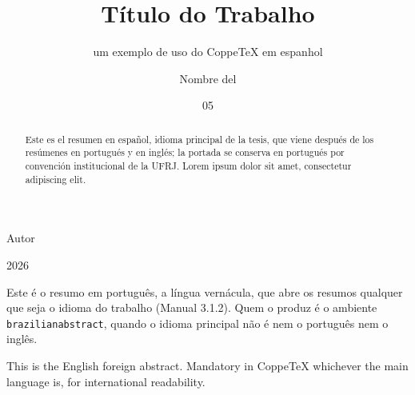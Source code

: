 \documentclass[spanish,dsc]{ufrj}
\begin{document}
  \title{Título do Trabalho}
  \subtitle{um exemplo de uso do CoppeTeX em espanhol}
  \author{Nombre del}{Autor}
  \date{05}{2026}
  \maketitle
  \frontmatter
  \begin{brazilianabstract}
    Este é o resumo em português, a língua vernácula, que abre os resumos
    qualquer que seja o idioma do trabalho (Manual 3.1.2). Quem o produz é o
    ambiente \texttt{brazilianabstract}, quando o idioma principal não é nem
    o português nem o inglês.
  \end{brazilianabstract}
  \begin{foreignabstract}
    This is the English foreign abstract. Mandatory in CoppeTeX whichever
    the main language is, for international readability.
  \end{foreignabstract}
  \begin{abstract}
    Este es el resumen en español, idioma principal de la tesis, que viene
    después de los resúmenes en portugués y en inglés; la portada se conserva
    en portugués por convención institucional de la UFRJ. Lorem ipsum dolor
    sit amet, consectetur adipiscing elit.
  \end{abstract}
  \tableofcontents
  \mainmatter
\end{document}
